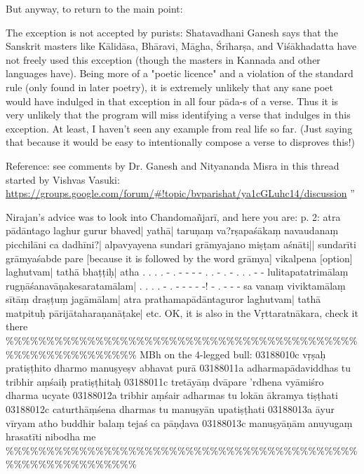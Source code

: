 \documentclass[11pt]{article}
\begin{document}
But anyway, to return to the main point:

The exception is not accepted by purists: Shatavadhani Ganesh says that the Sanskrit masters like
Kālidāsa, Bhāravi, Māgha, Śrīharṣa, and Viśākhadatta have not freely used this exception (though the masters in Kannada
and other languages have).
Being more of a "poetic licence" and a violation of the standard rule (only found in later poetry),
it is extremely unlikely that any sane poet would have indulged in that exception in all four pāda-s of a verse.
Thus it is very unlikely that the program will miss identifying a verse that indulges in this exception.
At least, I haven't seen any example from real life so far. (Just saying that because
it would be easy to intentionally compose a verse to disproves this!)

   Reference: see comments by Dr. Ganesh and Nityananda Misra in this thread started by Vishvas Vasuki:
   \url{https://groups.google.com/forum/\#!topic/bvparishat/ya1cGLuhc14/discussion}
''

Nirajan's advice was to look into Chandomañjarī, and here you are:
p. 2: 
atra pādāntago laghur gurur bhaved| yathā| 
taruṇaṃ va?rṣapaśākaṃ navaudanaṃ picchilāni ca dadhīni?|
alpavyayena sundari grāmyajano miṣṭam aśnāti||
sundarīti grāmyaśabde pare [because it is followed by the word grāmya] vikalpena [option] laghutvam|
tathā bhaṭṭiḥ| 
atha 
 . . . . -  . - -   -  - . . - . - . . . - -
lulitapatatrimālaṃ rugṇāśanavāṇakesaratamālam|
.   . .   . -  . - -  -  -    -! -   . - - -
sa vanaṃ viviktamālaṃ sītāṃ draṣṭuṃ jagāmālam|
atra prathamapādāntaguror laghutvam| tathā matpituḥ pārijātaharaṇanāṭake| etc.
OK, it is also in the Vṛttaratnākara, check it there
\%\%\%\%\%\%\%\%\%\%\%\%\%\%\%\%\%\%\%\%\%\%\%\%\%\%\%\%\%\%\%\%\%\%\%\%\%\%\%\%\%\%\%\%\%\%\%\%\%\%\%\%\%\%\%\%\%\%\%
MBh on the 4-legged bull:
03188010c vṛṣaḥ pratiṣṭhito dharmo manuṣyeṣv abhavat purā
03188011a adharmapādaviddhas tu tribhir aṃśaiḥ pratiṣṭhitaḥ
03188011c tretāyāṃ dvāpare 'rdhena vyāmiśro dharma ucyate
03188012a tribhir aṃśair adharmas tu lokān ākramya tiṣṭhati
03188012c caturthāṃśena dharmas tu manuṣyān upatiṣṭhati
03188013a āyur vīryam atho buddhir balaṃ tejaś ca pāṇḍava
03188013c manuṣyāṇām anuyugaṃ hrasatīti nibodha me
\%\%\%\%\%\%\%\%\%\%\%\%\%\%\%\%\%\%\%\%\%\%\%\%\%\%\%\%\%\%\%\%\%\%\%\%\%\%\%\%\%\%\%\%\%\%\%\%\%\%\%\%\%\%\%\%\%\%\%
\end{document}
